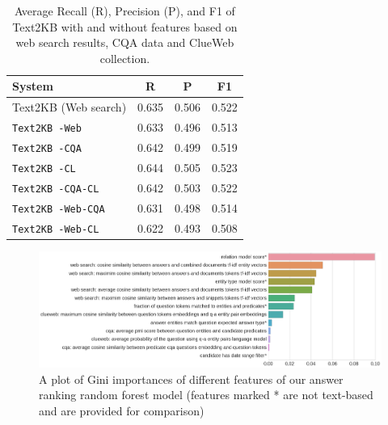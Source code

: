 \begin{table}[h]
\centering
\begin{tabular}{| p{6cm} | c | c | c | }
\hline
System & R & P &  F1 \\
\hline
Text2KB (Web search) & 0.635 & 0.506 & 0.522 \\
\hline
\texttt{Text2KB -Web} & 0.633 & 0.496 & 0.513 \\
\texttt{Text2KB -CQA} & 0.642 & 0.499 & 0.519 \\
\texttt{Text2KB -CL} & 0.644 & 0.505 & 0.523 \\
\hline
\texttt{Text2KB -CQA-CL} & 0.642 & 0.503 & 0.522 \\
\texttt{Text2KB -Web-CQA} & 0.631 & 0.498 & 0.514 \\
\texttt{Text2KB -Web-CL} & 0.622 & 0.493 & 0.508 \\
\hline
\end{tabular}
\caption{Average Recall (R), Precision (P), and F1 of Text2KB with and without features based on web search results, CQA data and ClueWeb collection.}
\label{table:text2kb:ablation:features}
\end{table}

\begin{figure}
\centering
\includegraphics[width=\textwidth]{img/feature_importances}
\caption{A plot of Gini importances of different features of our answer ranking random forest model (features marked * are not text-based and are provided for comparison)}
\label{figure:text2kb:feature_importances}
\end{figure}

